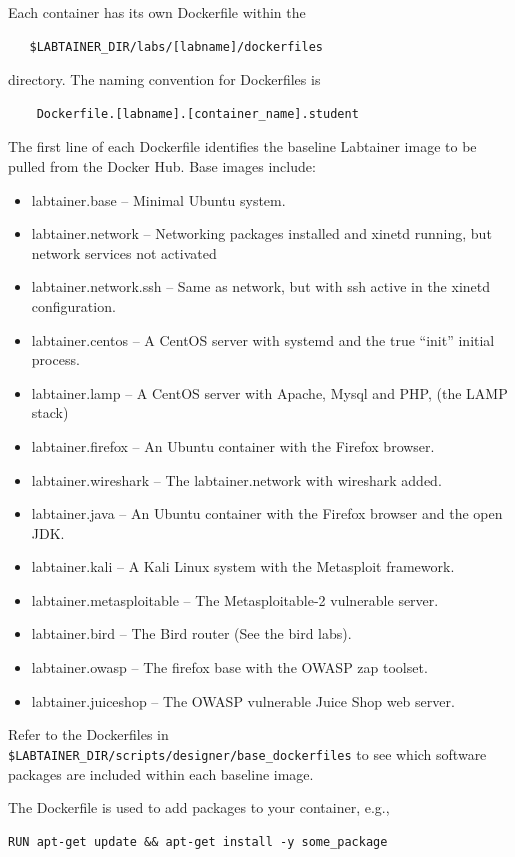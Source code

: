 \documentclass[12pt]{article}
\begin{document}
\noindent Each container has its own Dockerfile within the 
\begin{verbatim}
   $LABTAINER_DIR/labs/[labname]/dockerfiles
\end{verbatim}
\noindent directory.  The naming convention for Dockerfiles is
\begin{verbatim}
    Dockerfile.[labname].[container_name].student
\end{verbatim}

The first line of each Dockerfile identifies the baseline Labtainer image to be pulled from the Docker Hub.
\label{base-images}
\noindent Base images include:
\begin{itemize}
\item labtainer.base -- Minimal Ubuntu system.
\item labtainer.network -- Networking packages installed and xinetd running, but network services not activated
\item labtainer.network.ssh -- Same as network, but with ssh active in the xinetd configuration.
\item labtainer.centos -- A CentOS server with systemd and the true ``init'' initial process.
\item labtainer.lamp -- A CentOS server with Apache, Mysql and PHP, (the LAMP stack)
\item labtainer.firefox -- An Ubuntu container with the Firefox browser.
\item labtainer.wireshark -- The labtainer.network with wireshark added.
\item labtainer.java -- An Ubuntu container with the Firefox browser and the open JDK.
\item labtainer.kali -- A Kali Linux system with the Metasploit framework.
\item labtainer.metasploitable -- The Metasploitable-2 vulnerable server.
\item labtainer.bird -- The Bird router (See the bird labs).
\item labtainer.owasp -- The firefox base with the OWASP zap toolset.
\item labtainer.juiceshop -- The OWASP vulnerable Juice Shop web server.
\end{itemize}
Refer to the Dockerfiles in {\tt \$LABTAINER\_DIR/scripts/designer/base\_dockerfiles} to see which
software packages are included within each baseline image. 

The Dockerfile is used to add packages to your container, e.g., 
\begin{verbatim}
RUN apt-get update && apt-get install -y some_package
\end{verbatim}
\end{document}

